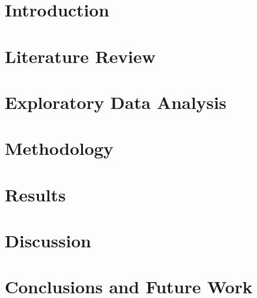 \documentclass[12pt,letterpaper]{ryerson}
\begin{document}
\begin{ryerson}
\chapter{Introduction}


\chapter{Literature Review}



\chapter{Exploratory Data Analysis}



\chapter{Methodology}



\chapter{Results}



\chapter{Discussion}



\chapter{Conclusions and Future Work}



\end{ryerson}


\begin{appendices}




\end{appendices}



\end{document}
